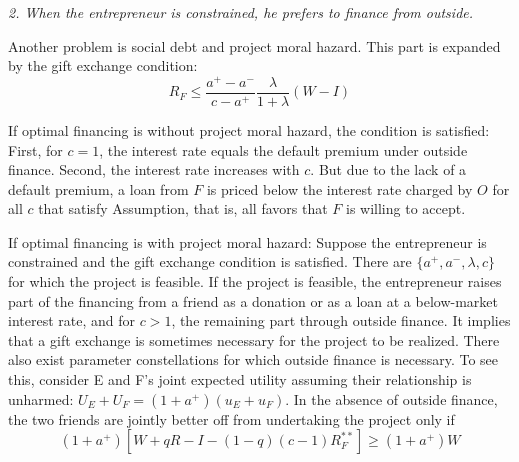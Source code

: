\documentclass{article}
\begin{document}
    \emph{2. When the entrepreneur is constrained, he prefers to finance from outside. }

    Another problem is social debt and project moral hazard. This part is expanded by the gift exchange condition: 
    \begin{equation}
        R_F\leq \frac{a^{+}-a^-}{c-a^+}\frac{\lambda}{1+\lambda}(W-I)
    \end{equation}

    If optimal financing is without project moral hazard, the condition is satisfied:
    First, for $c=1$, the interest rate equals the default premium under outside finance. Second, 
    the interest rate increases with $c$. But due to the lack of a default premium, a loan from $F$ is priced below the interest rate charged by $O$ for all $c$ that satisfy Assumption, that is, all favors that $F$ is willing to accept.

    If optimal financing is with project moral hazard: Suppose the entrepreneur is constrained and the gift exchange condition is satisfied. 
    There are $\{a^+, a^-, \lambda, c\}$ for which the project is feasible. If the project is feasible, the entrepreneur raises part of the financing from a friend as a donation or as a 
    loan at a below-market interest rate, and for $c > 1$, the remaining part through outside finance.
    It implies that a gift exchange is sometimes necessary for the project to be realized. There also exist parameter 
    constellations for which outside finance is necessary. To see this, consider E and F’s joint expected utility assuming their relationship is unharmed: $U_E + U_F = (1 + a^+) (u_E + u_F )$. In the absence of outside finance, the two friends are jointly better off 
    from undertaking the project only if
    \begin{equation}
        (1 + a^+) [W + qR - I - (1 - q)(c - 1)R_F^{**}]\ge (1 + a^+) W
    \end{equation}
\end{document}
